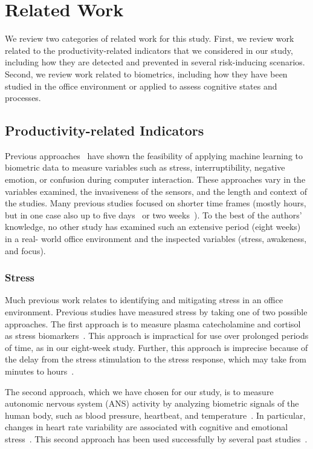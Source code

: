 \section{Related Work}
We review two categories of related work for this study. First, we review work related to the productivity-related indicators that we considered in our study, including how they are detected and prevented in several risk-inducing scenarios. Second, we review work related to biometrics, including how they have been studied in the office environment or applied to assess cognitive states and processes.

\subsection{Productivity-related Indicators}

Previous approaches~\cite{zuger18,Lalle16,Panwar18} have shown the feasibility of applying machine learning 
to biometric data to measure variables such as stress, interruptibility, 
negative emotion, or confusion during computer 
interaction. These approaches vary in the 
variables examined, the invasiveness of the sensors, and the length and 
context of the studies. Many previous studies focused on 
shorter time frames (mostly hours, but in one case also up to five 
days~\cite{sano2013stress} 
or two weeks~\cite{zuger18}). To the best of the authors' knowledge, no 
other study has examined such an extensive period (eight weeks) in a real-
world office environment and the inspected variables (stress, awakeness, and focus).


\subsubsection{Stress}
Much previous work relates to identifying and mitigating stress in an office environment.
Previous studies have measured stress by taking one of two possible approaches.
The first approach is to measure plasma catecholamine and cortisol as stress biomarkers~\cite{piazza10}.
This approach is impractical for use over prolonged periods of time, as in our eight-week study.
Further, this approach is imprecise because of the delay from the stress stimulation to the stress response, which 
may take from minutes to hours~\cite{Chandola10,Hellhammer09}.

The second approach, which we have chosen for our study, is to measure autonomic nervous system (ANS) activity by analyzing biometric signals of the human body, such as blood pressure, heartbeat, and temperature~\cite{kataoka00,Eekelen04,valentini10}.
In particular, changes in heart rate variability are associated with cognitive and emotional stress~\cite{mcduff16,dishman2000stress}.
This second approach has been used successfully by several past studies~\cite{Force96,gal07,montano09}.

